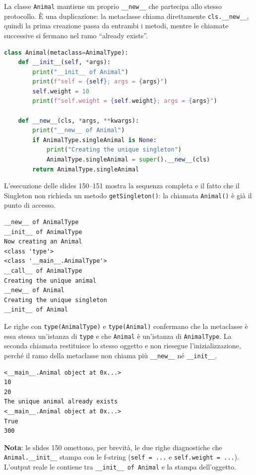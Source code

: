 \documentclass[12pt]{extarticle}
\begin{document}
\noindent La classe \texttt{Animal} mantiene un proprio \texttt{\_\_new\_\_} che partecipa allo stesso protocollo. È una duplicazione: la metaclasse chiama direttamente \texttt{cls.\_\_new\_\_}, quindi la prima creazione passa da entrambi i metodi, mentre le chiamate successive si fermano nel ramo ``already exists''.

\begin{lstlisting}[language=Python]
class Animal(metaclass=AnimalType):
    def __init__(self, *args):
        print("__init__ of Animal")
        print(f"self = {self}; args = {args}")
        self.weight = 10
        print(f"self.weight = {self.weight}; args = {args}")

    def __new__(cls, *args, **kwargs):
        print("__new__ of Animal")
        if AnimalType.singleAnimal is None:
            print("Creating the unique singleton")
            AnimalType.singleAnimal = super().__new__(cls)
        return AnimalType.singleAnimal
\end{lstlisting}

\noindent L'esecuzione delle slides 150--151 mostra la sequenza completa e il fatto che il Singleton non richieda un metodo \texttt{getSingleton()}: la chiamata \texttt{Animal()} è già il punto di accesso.

\begin{lstlisting}[numbers=none]
__new__ of AnimalType
__init__ of AnimalType
Now creating an Animal
<class 'type'>
<class '__main__.AnimalType'>
__call__ of AnimalType
Creating the unique animal
__new__ of Animal
Creating the unique singleton
__init__ of Animal
\end{lstlisting}

\noindent Le righe con \texttt{type(AnimalType)} e \texttt{type(Animal)} confermano che la metaclasse è essa stessa un'istanza di \texttt{type} e che \texttt{Animal} è un'istanza di \texttt{AnimalType}. La seconda chiamata restituisce lo stesso oggetto e non riesegue l'inizializzazione, perché il ramo della metaclasse non chiama più \texttt{\_\_new\_\_} né \texttt{\_\_init\_\_}.

\begin{lstlisting}[numbers=none]
<__main__.Animal object at 0x...>
10
20
The unique animal already exists
<__main__.Animal object at 0x...>
True
300
\end{lstlisting}

\noindent \textbf{Nota}: le slides 150 omettono, per brevità, le due righe diagnostiche che \texttt{Animal.\_\_init\_\_} stampa con le f-string (\texttt{self = ...} e \texttt{self.weight = ...}). L'output reale le contiene tra \texttt{\_\_init\_\_ of Animal} e la stampa dell'oggetto.
\end{document}
